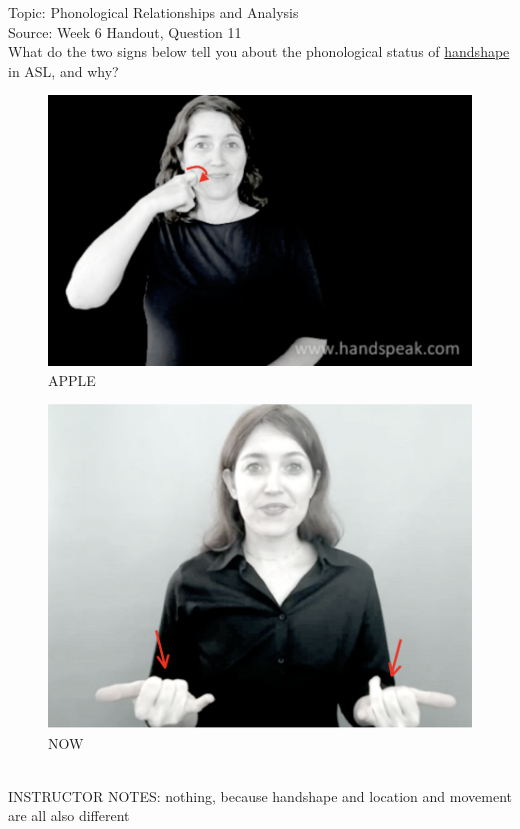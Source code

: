 \documentclass[12pt]{article}
\begin{document}
Topic: Phonological Relationships and Analysis\\
Source: Week 6 Handout, Question 11\\

What do the two signs below tell you about the phonological status of \underline{handshape} in ASL, and why?\\

\begin{figure}[H]
\includegraphics{../images/asl_apple.png}
\caption{APPLE}
\end{figure}
\begin{figure}[H]
\includegraphics{../images/asl_now.png}
\caption{NOW}
\end{figure}

~\\
INSTRUCTOR NOTES: nothing, because handshape and location and movement are all also different
\end{document}

